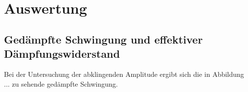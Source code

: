 \section{Auswertung}
\label{sec:Auswertung}

\subsection{Gedämpfte Schwingung und effektiver Dämpfungswiderstand}

Bei der Untersuchung der abklingenden Amplitude ergibt sich die
in Abbildung ... zu sehende gedämpfte Schwingung. 





